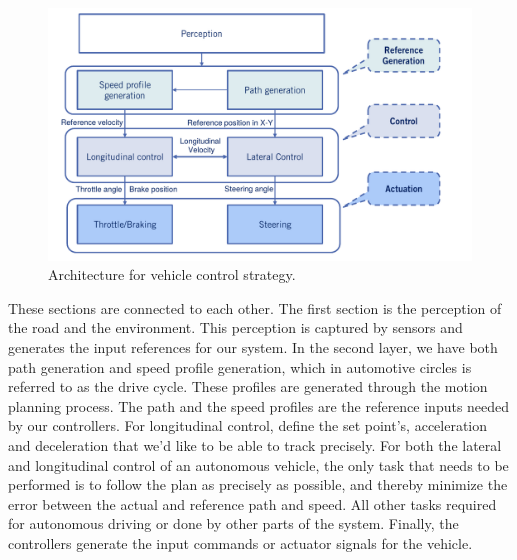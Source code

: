\begin{figure}[!htb]
\begin{center}
\includegraphics[scale=0.380]{img/longitudinal_control/architecture_vehicel_control_strategy.jpeg}
\end{center}
\caption{Architecture for vehicle control strategy.}
\label{architecture_vehicel_control_strategy}
\end{figure}

These sections are connected to each other. The first section is the perception of the road and the environment. 
This perception is captured by sensors and generates the input references for our system. 
In the second layer, we have both path generation and speed profile generation, which in automotive circles is referred to as the drive cycle. 
These profiles are generated through the motion planning process. 
The path and the speed profiles are the reference inputs needed by our controllers. For longitudinal control, define the set point's, acceleration and deceleration that we'd like to be able to track precisely. For both the lateral and longitudinal control of an autonomous vehicle, the only task that needs to be performed is to follow the plan as precisely as possible, and thereby minimize the error between the actual and reference path and speed. All other tasks required for autonomous driving or done by other parts of the system. 
Finally, the controllers generate the input commands or actuator signals for the vehicle. 

